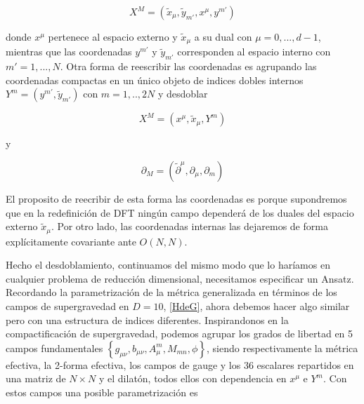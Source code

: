 \documentclass{article}
\numberwithin{equation}{section}
\begin{document}
\begin{equation}
X^M=(\widetilde{x}_{\mu}, \widetilde{y}_{m'}, x^{\mu}, y^{m'})
\end{equation}

donde $ x^{\mu} $ pertenece al espacio externo y $ \widetilde{x}_{\mu} $ a su dual con $ \mu=0,...,d-1 $, mientras que las coordenadas $ y^{m'} $ y $ \widetilde{y}_{m'} $ corresponden al espacio interno con $ m'=1,...,N $. Otra forma de reescribir las coordenadas es agrupando las coordenadas compactas en un único objeto de indices dobles internos $ Y^m=(y^{m'}, \widetilde{y}_{m'}) $ con $ m= 1,..,2N $ y desdoblar 

\begin{equation}
X^M=(x^{\mu}, \widetilde{x}_{\mu}, Y^m)
\end{equation}

y

\begin{equation}
\partial_M = (\widetilde{\partial}^{\mu}, \partial_{\mu}, \partial_m)
\end{equation}

El proposito de reecribir de esta forma las coordenadas es porque supondremos que en la redefinición de DFT ningún campo dependerá de los duales del espacio externo $ \widetilde{x}_{\mu} $. Por otro lado, las coordenadas internas las dejaremos de forma explícitamente covariante ante $ O(N,N) $.

Hecho el desdoblamiento, continuamos del mismo modo que lo haríamos en cualquier problema de reducción dimensional, necesitamos especificar un Ansatz. Recordando la parametrización de la métrica generalizada en términos de los campos de supergravedad en $ D=10 $, \ref{HdeG}, ahora debemos hacer algo similar pero con una estructura de indices diferentes. Inspirandonos en la compactificación de supergravedad, podemos agrupar los grados de libertad en 5 campos fundamentales $ \left\{ g_{\mu \nu}, b_{\mu \nu}, A_{\mu}^m, M_{m n}, \phi \right\} $, siendo respectivamente la métrica efectiva, la 2-forma efectiva, los campos de gauge y los 36 escalares repartidos en una matriz de $ N \times N $ y el dilatón, todos ellos con dependencia en $ x^{\mu} $ e $ Y^m $. Con estos campos una posible parametrización es
\end{document}
